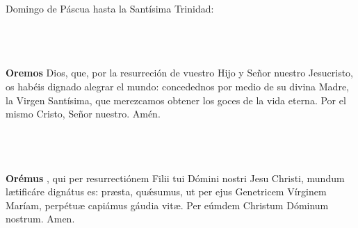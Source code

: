 \documentclass[10pt,a4paper,oneside]{book}
\begin{document}
\bigskip

\noindent\small{Domingo de Páscua hasta la Santísima Trinidad:}\\
\begin{minipage}[t]{0.475\textwidth}
      \\[1mm]
      \\[1mm]
      \\[2mm]
      \textbf{Oremos}
       Dios, que, por la resurreción de vuestro Hijo y Señor nuestro Jesucristo,
      os habéis dignado alegrar el mundo: concedednos por medio de su divina Madre, la Virgen Santísima,
      que merezcamos obtener los goces de la vida eterna. Por el mismo Cristo, Señor nuestro. Amén.
\end{minipage}
\begin{minipage}[t]{0.475\textwidth}
      \\[1mm]
      \\[1mm]
      \\[2mm]
      \textbf{Orémus}
      , qui per resurrectiónem Filii tui Dómini nostri Jesu Christi,
      mundum l{\ae}tificáre dignátus es: pr{\ae}sta, qu{\'\ae}sumus, ut per ejus Genetricem Vírginem Maríam,
      perpétu{\ae} capiámus gáudia vit{\ae}. Per eúmdem Christum Dóminum nostrum. Amen.
\end{minipage}

\bigskip
\end{document}
